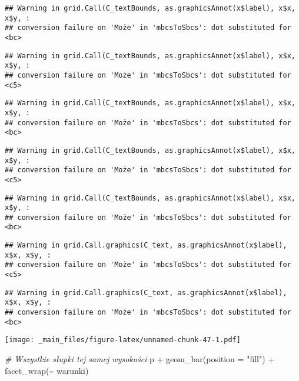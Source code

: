 \documentclass[
]{book}
\newenvironment{Shaded}{\begin{snugshade}}{\end{snugshade}}
\newcommand{\AttributeTok}[1]{\textcolor[rgb]{0.77,0.63,0.00}{#1}}
\newcommand{\CommentTok}[1]{\textcolor[rgb]{0.56,0.35,0.01}{\textit{#1}}}
\newcommand{\FunctionTok}[1]{\textcolor[rgb]{0.00,0.00,0.00}{#1}}
\newcommand{\NormalTok}[1]{#1}
\newcommand{\SpecialCharTok}[1]{\textcolor[rgb]{0.00,0.00,0.00}{#1}}
\newcommand{\StringTok}[1]{\textcolor[rgb]{0.31,0.60,0.02}{#1}}
\begin{document}
\begin{verbatim}
## Warning in grid.Call(C_textBounds, as.graphicsAnnot(x$label), x$x, x$y, :
## conversion failure on 'Może' in 'mbcsToSbcs': dot substituted for <bc>
\end{verbatim}

\begin{verbatim}
## Warning in grid.Call(C_textBounds, as.graphicsAnnot(x$label), x$x, x$y, :
## conversion failure on 'Może' in 'mbcsToSbcs': dot substituted for <c5>
\end{verbatim}

\begin{verbatim}
## Warning in grid.Call(C_textBounds, as.graphicsAnnot(x$label), x$x, x$y, :
## conversion failure on 'Może' in 'mbcsToSbcs': dot substituted for <bc>
\end{verbatim}

\begin{verbatim}
## Warning in grid.Call(C_textBounds, as.graphicsAnnot(x$label), x$x, x$y, :
## conversion failure on 'Może' in 'mbcsToSbcs': dot substituted for <c5>
\end{verbatim}

\begin{verbatim}
## Warning in grid.Call(C_textBounds, as.graphicsAnnot(x$label), x$x, x$y, :
## conversion failure on 'Może' in 'mbcsToSbcs': dot substituted for <bc>
\end{verbatim}

\begin{verbatim}
## Warning in grid.Call.graphics(C_text, as.graphicsAnnot(x$label), x$x, x$y, :
## conversion failure on 'Może' in 'mbcsToSbcs': dot substituted for <c5>
\end{verbatim}

\begin{verbatim}
## Warning in grid.Call.graphics(C_text, as.graphicsAnnot(x$label), x$x, x$y, :
## conversion failure on 'Może' in 'mbcsToSbcs': dot substituted for <bc>
\end{verbatim}

\texttt{[image: \_main\_files/figure-latex/unnamed-chunk-47-1.pdf]}

\begin{Shaded}
\begin{Highlighting}[]
\CommentTok{\# Wszystkie słupki tej samej wysokości}
\NormalTok{p }\SpecialCharTok{+} \FunctionTok{geom\_bar}\NormalTok{(}\AttributeTok{position =} \StringTok{"fill"}\NormalTok{) }\SpecialCharTok{+} \FunctionTok{facet\_wrap}\NormalTok{(}\SpecialCharTok{\textasciitilde{}}\NormalTok{ warunki)}
\end{Highlighting}
\end{Shaded}
\end{document}
